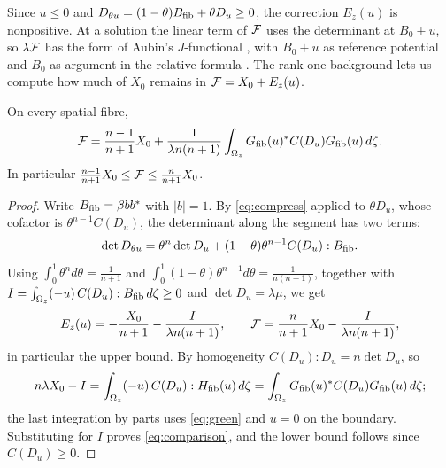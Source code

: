 Since $u\le0$ and $D_{\theta u}=(1-\theta)B_{\rm fib}+\theta D_u\ge0$, the correction $E_z(u)$ is
nonpositive. At a solution the linear term of $\mathcal F$ uses the determinant at $B_0+u$, so
$\lambda\mathcal F$ has the form of Aubin's $J$-functional \cite[p.~145]{Aub84}, with $B_0+u$ as
reference potential and $B_0$ as argument in the relative formula \cite[\S2.1]{BBGZ13}. The
rank-one background lets us compute how much of $X_0$ remains in $\mathcal F=X_0+E_z(u)$.

\begin{lemma}\label{lem:comparison}
On every spatial fibre,
\begin{equation}\label{eq:comparison}
\mathcal F=\frac{n-1}{n+1}X_0+\frac1{\lambda n(n+1)}\int_{\Omega_z}G_{\mathrm{fib}}(u)^*C(D_u)G_{\mathrm{fib}}(u)\,d\zeta .
\end{equation}
In particular $\frac{n-1}{n+1}X_0\le\mathcal F\le\frac n{n+1}X_0$.
\end{lemma}

\begin{proof}
Write $B_{\rm fib}=\beta bb^*$ with $|b|=1$. By \eqref{eq:compress} applied to $\theta D_u$, whose
cofactor is $\theta^{n-1}C(D_u)$, the determinant along the segment has two terms:
\[
\det D_{\theta u}=\theta^n\det D_u+(1-\theta)\theta^{n-1}C(D_u):B_{\rm fib}.
\]
Using $\int_0^1\theta^nd\theta=\frac1{n+1}$ and $\int_0^1(1-\theta)\theta^{n-1}d\theta=\frac1{n(n+1)}$, together with
$I=\int_{\Omega_z}(-u)\,C(D_u):B_{\rm fib}\,d\zeta\ge0$ and $\det D_u=\lambda\mu$, we get
\[
E_z(u)=-\frac{X_0}{n+1}-\frac{I}{\lambda n(n+1)},\qquad
\mathcal F=\frac n{n+1}X_0-\frac I{\lambda n(n+1)} ,
\]
in particular the upper bound. By homogeneity $C(D_u):D_u=n\det D_u$, so
\[
n\lambda X_0-I=\int_{\Omega_z}(-u)\,C(D_u):H_{\mathrm{fib}}(u)\,d\zeta=\int_{\Omega_z}G_{\mathrm{fib}}(u)^*C(D_u)G_{\mathrm{fib}}(u)\,d\zeta ;
\]
the last integration by parts uses \eqref{eq:green} and $u=0$ on the boundary. Substituting
for $I$ proves \eqref{eq:comparison}, and the lower bound follows since $C(D_u)\ge0$.
\end{proof}
